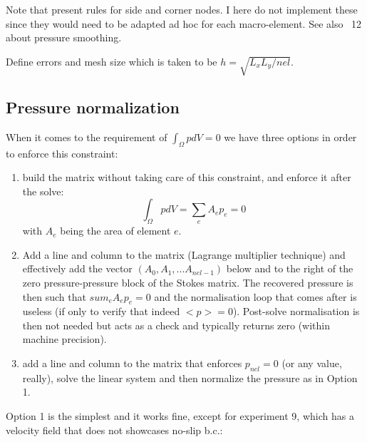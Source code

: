 Note that \textcite{sagl81a} present rules for side and corner nodes. I here do not implement these
since they would need to be adapted ad hoc for each macro-element.
See also \stone~12 about pressure smoothing.

Define errors and mesh size which is taken to be $h = \sqrt{L_xL_y/nel}$. 

\subsection*{Pressure normalization}

When it comes to the requirement of $\int_\Omega p dV=0$ we have three options
in order to enforce this constraint:
\begin{enumerate}
\item build the matrix without taking care of this constraint, and 
enforce it after the solve:
\[
\int_\Omega p dV = \sum_e A_e p_e = 0
\]
with $A_e$ being the area of element $e$.

\item Add a line and column to the matrix (Lagrange multiplier technique)
and effectively add the vector $(A_0,	 A_1, ... A_{nel-1})$ below and to the 
right of the zero pressure-pressure block of the Stokes matrix. 
The recovered pressure is then such that $sum_e A_e p_e = 0$
and the normalisation loop that comes after is useless (if only to 
verify that indeed $<p>=0$).
Post-solve normalisation is then not needed but acts as a check 
and typically returns zero (within machine precision).

\item add a line and column to the matrix that enforces $p_{nel}=0$
(or any value, really), solve the linear system and then 
normalize the pressure as in Option 1.

\end{enumerate}

Option 1 is the simplest and it works fine, except for 
experiment 9, which has a velocity field that 
does not showcases no-slip b.c.:

